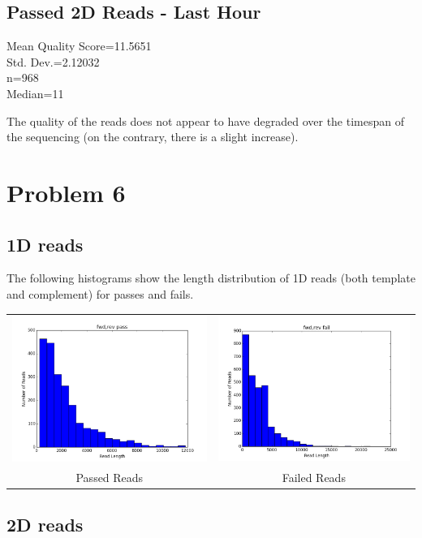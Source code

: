\documentclass[11pt]{article}
\begin{document}
\subsection*{Passed 2D Reads - Last Hour}
Mean Quality Score=11.5651\\  Std. Dev.=2.12032\\ n=968\\
Median=11

The quality of the reads does not appear to have degraded over the timespan of the sequencing
(on the contrary, there is a slight increase).
\section*{Problem 6}
\subsection*{1D reads}

        The following histograms show the length distribution of 1D reads (both template and complement) for passes and fails.

        \begin{tabular}{cc}
          \includegraphics[width=.48\textwidth]{1Dpasses}
          &
          \includegraphics[width=.48\textwidth]{1Dfailures}
          \\
          Passed Reads
          &
          Failed Reads
        \end{tabular}
        

\subsection*{2D reads}
\end{document}
